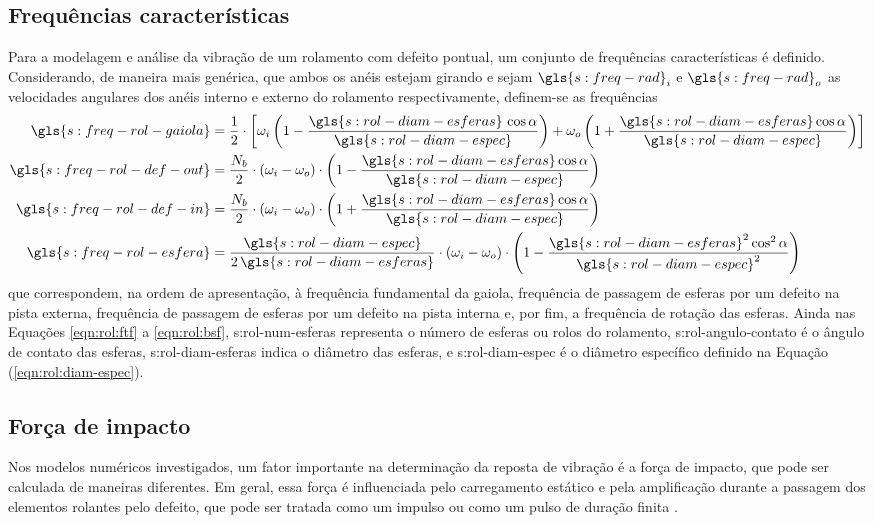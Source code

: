 \documentclass[12pt,oneside,english,brazil,lmodern,siglas,simbolos,cite=num]{ucsmonograph}
\begin{document}
	\subsection{Frequências características}
	Para a modelagem e análise da vibração de um rolamento com defeito pontual, um conjunto de frequências características é definido.
	Considerando, de maneira mais genérica, que ambos os anéis estejam girando e sejam $ \gls{s:freq-rad}_i $ e $ \gls{s:freq-rad}_o $ as velocidades angulares dos anéis interno e externo do rolamento respectivamente, definem-se as frequências \cite{sassi:2007}
	\begin{align}
		\gls{s:freq-rol-gaiola} &= \frac{1}{2}\cdot\left[ \omega_i\left(1-\frac{\gls{s:rol-diam-esferas}\,\cos\alpha}{\gls{s:rol-diam-espec}} \right) + \omega_o\left(1+\frac{\gls{s:rol-diam-esferas}\cos\alpha}{\gls{s:rol-diam-espec}} \right) \right] \label{eqn:rol:ftf}\\
		\gls{s:freq-rol-def-out} &= \frac{N_b}{2}\cdot(\omega_i-\omega_o)\cdot\left(1-\frac{\gls{s:rol-diam-esferas}\cos\alpha}{\gls{s:rol-diam-espec}} \right) \label{eqn:rol:bpfo}\\
		\gls{s:freq-rol-def-in} &= \frac{N_b}{2}\cdot(\omega_i-\omega_o)\cdot\left(1+\frac{\gls{s:rol-diam-esferas}\cos\alpha}{\gls{s:rol-diam-espec}} \right) \label{eqn:rol:bpfi}\\
		\gls{s:freq-rol-esfera} &= \frac{\gls{s:rol-diam-espec}}{2\,\gls{s:rol-diam-esferas}}\cdot(\omega_i-\omega_o)\cdot\left(1-\frac{\gls{s:rol-diam-esferas}^2\cos^2\alpha}{\gls{s:rol-diam-espec}^2} \right) \label{eqn:rol:bsf}
	\end{align}
	que correspondem, na ordem de apresentação, à frequência fundamental da gaiola, frequência de passagem de esferas por um defeito na pista externa, frequência de passagem de esferas por um defeito na pista interna e, por fim, a frequência de rotação das esferas.
	Ainda nas Equações \ref{eqn:rol:ftf} a \ref{eqn:rol:bsf}, \gls{s:rol-num-esferas} representa o número de esferas ou rolos do rolamento, \gls{s:rol-angulo-contato} é o ângulo de contato das esferas, \gls{s:rol-diam-esferas} indica o diâmetro das esferas, e \gls{s:rol-diam-espec} é o diâmetro específico definido na Equação (\ref{eqn:rol:diam-espec}).
	
	\subsection{Força de impacto}
	Nos modelos numéricos investigados, um fator importante na determinação da reposta de vibração é a força de impacto, que pode ser calculada de maneiras diferentes.
	Em geral, essa força é influenciada pelo carregamento estático e pela amplificação durante a passagem dos elementos rolantes pelo defeito, que pode ser tratada como um impulso \cite{mcfadden:1984,sassi:2007,cong:2013} ou como um pulso de duração finita \cite{tandon:1997}.
	
\end{document}
